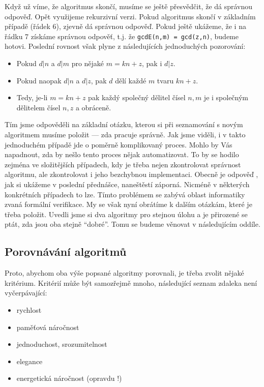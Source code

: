 Když už víme, že algoritmus skončí, musíme se ještě přesvědčit, že dá správnou odpověď.  Opět využijeme rekurzivní verzi.  Pokud algoritmus
skončí v základním případě (řádek 6), zjevně dá správnou odpověď. Pokud ještě ukážeme, že i na řádku 7 získáme správnou odpověť, t.j. že {\tt gcdE(n,m) = gcd(z,n)},
budeme hotovi. Poslední rovnost však plyne z následujících jednoduchých pozorování:

\begin{itemize}
 \item Pokud $d|n$ a $d|m$ pro nějaké $m = kn + z$, pak i $d|z$.
 \item Pokud naopak $d|n$ a $d|z$, pak $d$ dělí každé $m$ tvaru $ kn + z$.
 \item Tedy, je-li $m = kn + z$ pak každý společný dělitel čísel $n,m$ je i společným dělitelem čísel $n,z$ a obráceně.
\end{itemize}

Tím jsme odpověděli na základní otázku, kterou si při seznamování s novým algoritmem musíme položit --- zda pracuje správně. Jak jsme viděli, i v takto jednoduchém
případě jde o poměrně komplikovaný proces. Mohlo by Vás napadnout, zda by nešlo tento proces nějak automatizovat. To by se hodilo zejména ve složitějších případech,
kdy je třeba nejen zkontrolovat správnost algoritmu, ale zkontrolovat i jeho bezchybnou implementaci. Obecně je odpověď , jak si ukážeme v poslední přednášce, naneštěstí
záporná. Nicméně v některých konkrétních případech to lze. Tímto problémem se zabývá oblast informatiky zvaná formální verifikace.  My se však nyní obrátíme k dalším
otázkám, které je třeba položit. Uvedli jsme si dva algoritmy pro stejnou úlohu a je přirozené se ptát, zda jsou oba stejně ``dobré''.  Tomu se budeme věnovat v následujícím oddíle.

\subsection*{Porovnávání algoritmů} 
Proto, abychom oba výše popsané algoritmy porovnali, je třeba zvolit nějaké kritérium. Kritérií může být samozřejmě mnoho,
následující seznam zdaleka není vyčerpávající:

\begin{itemize}
 \item rychlost
 \item paměťová náročnost
 \item jednoduchost, srozumitelnost
 \item elegance
 \item energetická náročnost (opravdu !)
\end{itemize}

